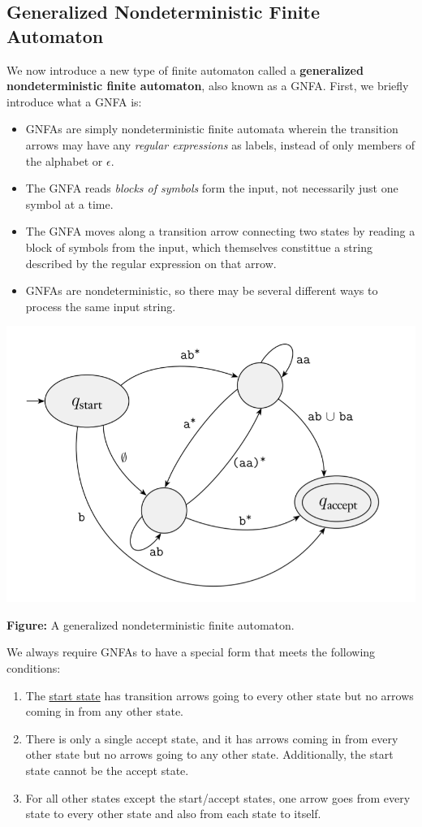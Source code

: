 \documentclass[letterpaper]{article}
\begin{document}
\subsection{Generalized Nondeterministic Finite Automaton}
We now introduce a new type of finite automaton called a \textbf{generalized nondeterministic finite automaton}, also known as a GNFA. First, we briefly introduce what a GNFA is:
\begin{itemize}
    \item GNFAs are simply nondeterministic finite automata wherein the transition arrows may have any \emph{regular expressions} as labels, instead of only members of the alphabet or $\epsilon$. 
    \item The GNFA reads \emph{blocks of symbols} form the input, not necessarily just one symbol at a time.
    \item The GNFA moves along a transition arrow connecting two states by reading a block of symbols from the input, which themselves constittue a string described by the regular expression on that arrow. 
    \item GNFAs are nondeterministic, so there may be several different ways to process the same input string.
\end{itemize}
\begin{center}
    \includegraphics[scale=0.4]{../assets/gnfa_ex_1.png}

    \textbf{Figure:} A generalized nondeterministic finite automaton.
\end{center}
We always require GNFAs to have a special form that meets the following conditions: 
\begin{enumerate}
    \item The \underline{start state} has transition arrows going to every other state but no arrows coming in from any other state. 
    \item There is only a single accept state, and it has arrows coming in from every other state but no arrows going to any other state. Additionally, the start state cannot be the accept state. 
    \item For all other states except the start/accept states, one arrow goes from every state to every other state and also from each state to itself. 
\end{enumerate}
\end{document}
